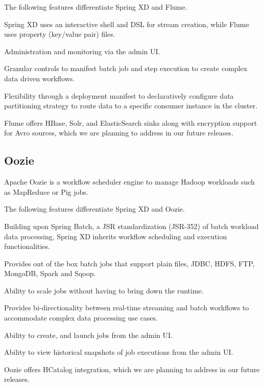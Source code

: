 The following features differentiate Spring XD and Flume.

\begin{itemize*}
\item Spring XD uses an interactive shell and DSL for stream creation,
while Flume uses property (key/value pair) files.
\item Administration and monitoring via the admin UI.
\item Granular controls to manifest batch job and step execution to create
complex data driven workflows.
\item Flexibility through a deployment manifest to declaratively configure data
partitioning strategy to route data to a specific consumer instance in the cluster.
\end{itemize*}

Flume offers HBase, Solr, and ElasticSearch sinks along with encryption support
for Avro sources, which we are planning to address in our future releases.

\subsection{Oozie}
Apache Oozie\cite{oozie} is a workflow scheduler engine to manage Hadoop \cite{hadoop} 
workloads such as MapReduce or Pig jobs.

The following features differentiate Spring XD and Oozie.

\begin{itemize*}
\item Building upon Spring Batch, a JSR standardization (JSR-352) of batch
workload data processing, Spring XD inherits workflow scheduling and execution
functionalities.
\item Provides out of the box batch jobs that support plain files, JDBC, HDFS,
FTP, MongoDB, Spark and Sqoop.
\item Ability to scale jobs without having to bring down the runtime.
\item Provides bi-directionality between real-time streaming and batch 
workflows to accommodate complex data processing use cases.
\item Ability to create, and launch jobs from the admin UI.
\item Ability to view historical snapshots of job executions from the admin UI.
\end{itemize*}

Oozie offers HCatalog integration, which we are planning to address in our 
future releases.

